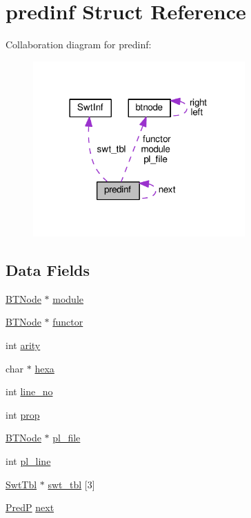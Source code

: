 \hypertarget{structpredinf}{}\section{predinf Struct Reference}
\label{structpredinf}


Collaboration diagram for predinf\+:\nopagebreak
\begin{figure}[H]
\begin{center}
\leavevmode
\includegraphics[width=230pt]{structpredinf__coll__graph}
\end{center}
\end{figure}
\subsection*{Data Fields}
\begin{DoxyCompactItemize}
\item 
\hyperlink{bt__string_8h_a94e2311ccccb66fae2c4ce55649526fc}{B\+T\+Node} $\ast$ \hyperlink{structpredinf_a5f44f90f1226e1463e76665aaf490a9d}{module}
\item 
\hyperlink{bt__string_8h_a94e2311ccccb66fae2c4ce55649526fc}{B\+T\+Node} $\ast$ \hyperlink{structpredinf_a6ae4c5cbb30b0db0b0dde51084453eee}{functor}
\item 
int \hyperlink{structpredinf_a16871c2b0c2e29058abe513301f0b7b0}{arity}
\item 
char $\ast$ \hyperlink{structpredinf_ab6fc21ba8f80aea382dfd11b9a50e7ac}{hexa}
\item 
int \hyperlink{structpredinf_ae858dcfb66886799f41d0042ccf8667e}{line\+\_\+no}
\item 
int \hyperlink{structpredinf_a39785936db83e7bcf5036b5365423c5e}{prop}
\item 
\hyperlink{bt__string_8h_a94e2311ccccb66fae2c4ce55649526fc}{B\+T\+Node} $\ast$ \hyperlink{structpredinf_a85bb945f5415fd2177b55ce91562c36c}{pl\+\_\+file}
\item 
int \hyperlink{structpredinf_a0bb58f984add8b6a8e040181a8181cbd}{pl\+\_\+line}
\item 
\hyperlink{wam__inst_8h_a19e4cdaf3d7b5228784d74de87e0580b}{Swt\+Tbl} $\ast$ \hyperlink{structpredinf_a9e448a6b5c08b225ac0a07043f3a37c9}{swt\+\_\+tbl} \mbox{[}3\mbox{]}
\item 
\hyperlink{wam2ma_8c_ad716afd8d1e245eaab1bb14fd5116bfe}{PredP} \hyperlink{structpredinf_a5640b4a5b40d6208119e14349a52d8db}{next}
\end{DoxyCompactItemize}


